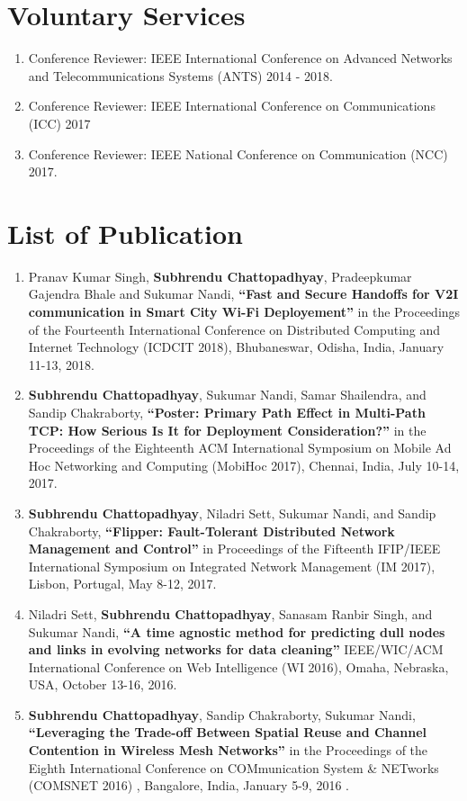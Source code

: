 \documentclass{res}
\newcommand{\papertitle}[1]{\textbf{ ``#1''}}
\begin{document}
\begin{resume}
\section{Voluntary Services}
  \begin{enumerate}
   \item Conference Reviewer: IEEE International Conference on Advanced Networks and Telecommunications Systems (ANTS) 2014 - 2018.
   \item Conference Reviewer: IEEE  International Conference on Communications (ICC) 2017
   \item Conference Reviewer: IEEE National Conference on Communication (NCC) 2017.
  \end{enumerate}
\section{List of Publication} 
	\begin{enumerate}
		\item Pranav Kumar Singh, {\bf Subhrendu Chattopadhyay}, Pradeepkumar Gajendra Bhale and Sukumar Nandi, \papertitle{Fast and Secure Handoffs for V2I communication in Smart City Wi-Fi Deployement} in the Proceedings of the Fourteenth International Conference on Distributed Computing and Internet Technology (ICDCIT 2018), Bhubaneswar, Odisha, India, January 11-13, 2018. 
		\item {\bf Subhrendu Chattopadhyay}, Sukumar Nandi, Samar Shailendra, and Sandip Chakraborty,\papertitle{Poster: Primary Path Effect in Multi-Path TCP: How Serious Is It for Deployment Consideration?} in the Proceedings of the Eighteenth ACM International Symposium on Mobile Ad Hoc Networking and Computing (MobiHoc 2017), Chennai, India, July 10-14, 2017. 
		\item {\bf Subhrendu Chattopadhyay}, Niladri Sett, Sukumar Nandi, and Sandip Chakraborty,\papertitle{Flipper: Fault-Tolerant Distributed Network Management and Control} in Proceedings of the Fifteenth IFIP/IEEE International Symposium on Integrated Network Management (IM 2017), Lisbon, Portugal, May 8-12, 2017. 
		\item 	Niladri Sett, {\bf Subhrendu Chattopadhyay}, Sanasam Ranbir Singh, and Sukumar Nandi, \papertitle{A time agnostic method for predicting dull nodes and links in evolving networks for data cleaning} IEEE/WIC/ACM International Conference on Web Intelligence (WI 2016), Omaha, Nebraska, USA, October 13-16, 2016. 
		\item {\bf Subhrendu Chattopadhyay}, Sandip Chakraborty, Sukumar Nandi, \papertitle{Leveraging the Trade-off Between Spatial Reuse and Channel Contention in Wireless Mesh Networks} in the Proceedings of the Eighth International Conference on COMmunication System \& NETworks {(COMSNET 2016)} , Bangalore, India, January 5-9, 2016 .

\end{enumerate}
\end{resume}
\end{document}

